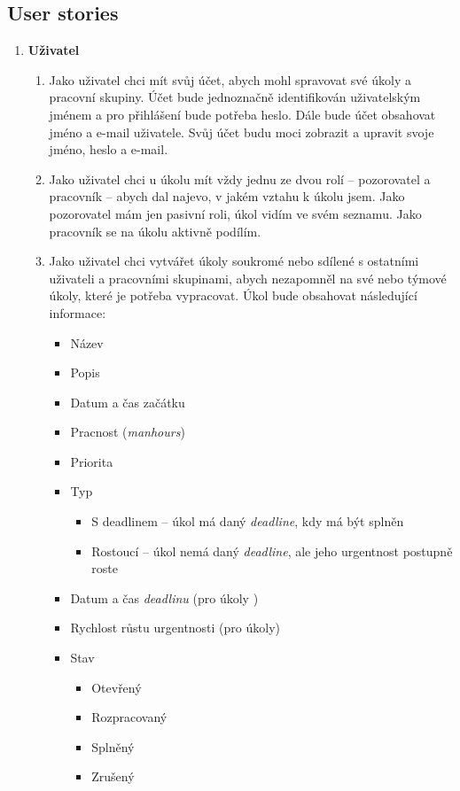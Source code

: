\documentclass[thesis=B,czech]{FITthesis}[2012/06/26]
\begin{document}
		\subsection{User stories}
		\label{sec:user-stories}
		\begin{enumerate}
			\item \textbf{Uživatel}
			\begin{enumerate}
				\item Jako uživatel chci mít svůj účet, abych mohl spravovat své úkoly a pracovní skupiny. Účet bude jednoznačně identifikován uživatelským jménem a pro přihlášení bude potřeba heslo. Dále bude účet obsahovat jméno a e-mail uživatele. Svůj účet budu moci zobrazit a upravit svoje jméno, heslo a e-mail.
				
				\item Jako uživatel chci u úkolu mít vždy jednu ze dvou rolí -- pozorovatel a pracovník -- abych dal najevo, v jakém vztahu k úkolu jsem. Jako pozorovatel mám jen pasivní roli, úkol vidím ve svém seznamu. Jako pracovník se na úkolu aktivně podílím.
				
				\item Jako uživatel chci vytvářet úkoly soukromé nebo sdílené s ostatními uživateli a pracovními skupinami, abych nezapomněl na své nebo týmové úkoly, které je potřeba vypracovat. Úkol bude obsahovat následující informace:
				\begin{itemize}
					\item Název
					\item Popis
					\item Datum a čas začátku
					\item Pracnost (\textit{manhours})
					\item Priorita
					\item Typ
					\begin{itemize}
						\item S deadlinem -- úkol má daný \textit{deadline}, kdy má být splněn
						\item Rostoucí -- úkol nemá daný \textit{deadline}, ale jeho urgentnost postupně roste
					\end{itemize}
					\item Datum a čas \textit{deadlinu} (pro úkoly )
					\item Rychlost růstu urgentnosti (pro  úkoly)
					\item Stav
					\begin{itemize}
						\item Otevřený
						\item Rozpracovaný
						\item Splněný
						\item Zrušený
					\end{itemize}
				\end{itemize}
				

\end{enumerate}
\end{enumerate}
\end{document}
